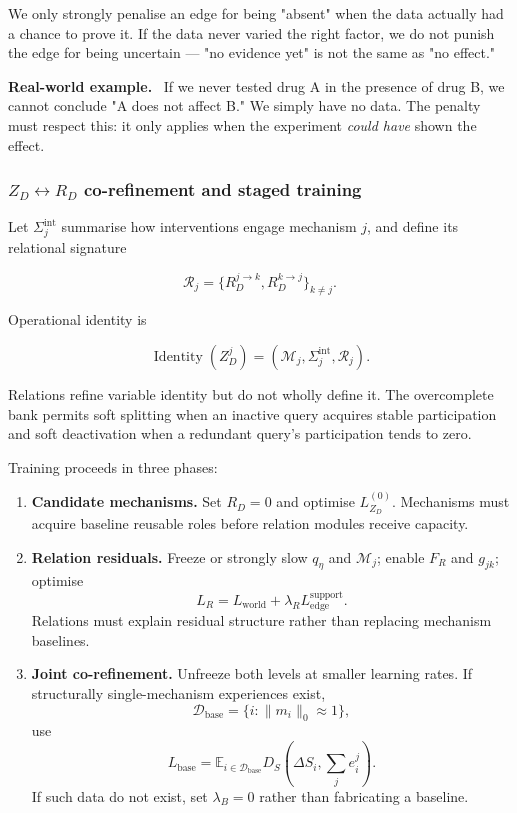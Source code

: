 \documentclass[11pt]{article}
\newenvironment{plainword}{%
  \par\medskip\noindent\begin{minipage}{\textwidth}%
  \color{gray!75!black}\small\itshape
}{%
  \end{minipage}\par\medskip}
\newenvironment{example}{%
  \par\smallskip\noindent\begin{minipage}{\textwidth}%
  \color{teal!60!black}\small
  \textbf{\color{teal!70!black}Real-world example.}\
}{%
  \end{minipage}\par\smallskip}
\begin{document}
\begin{plainword}
We only strongly penalise an edge for being "absent" when the data actually had a chance to prove it. If the data never varied the
right factor, we do not punish the edge for being uncertain --- "no evidence yet" is not the same as "no effect."
\end{plainword}

\begin{example}
If we never tested drug A in the presence of drug B, we cannot conclude "A does not affect B." We simply have no data. The penalty
must respect this: it only applies when the experiment \emph{could have} shown the effect.
\end{example}

\subsubsection*{$Z_D\leftrightarrow R_D$ co-refinement and staged training}

Let $\Sigma_j^{\mathrm{int}}$ summarise how interventions engage mechanism $j$, and define its relational signature

\[
\mathcal R_j=\{R_D^{j\rightarrow k},R_D^{k\rightarrow j}\}_{k\neq j}.
\]

Operational identity is

\[
\boxed{
\operatorname{Identity}(Z_D^j)=
(\mathcal M_j,\Sigma_j^{\mathrm{int}},\mathcal R_j).}
\]

Relations refine variable identity but do not wholly define it. The overcomplete bank permits soft splitting when an inactive query
acquires stable participation and soft deactivation when a redundant query's participation tends to zero.

Training proceeds in three phases:

\begin{enumerate}
\item \textbf{Candidate mechanisms.} Set $R_D=0$ and optimise $L_{Z_D}^{(0)}$. Mechanisms must acquire baseline reusable roles
before relation modules receive capacity.
\item \textbf{Relation residuals.} Freeze or strongly slow $q_\eta$ and $\mathcal M_j$; enable $F_R$ and $g_{jk}$; optimise
\[
\boxed{L_R=L_{\mathrm{world}}+\lambda_RL_{\mathrm{edge}}^{\mathrm{support}}.}
\]
Relations must explain residual structure rather than replacing mechanism baselines.
\item \textbf{Joint co-refinement.} Unfreeze both levels at smaller learning rates. If structurally single-mechanism experiences exist,
\[
\mathcal D_{\mathrm{base}}=\{i:\|m_i\|_0\approx1\},
\]
use
\[
\boxed{L_{\mathrm{base}}=
\mathbb E_{i\in\mathcal D_{\mathrm{base}}}
D_S\!\left(\Delta S_i,\sum_je_i^j\right).}
\]
If such data do not exist, set $\lambda_B=0$ rather than fabricating a baseline.
\end{enumerate}
\end{document}
